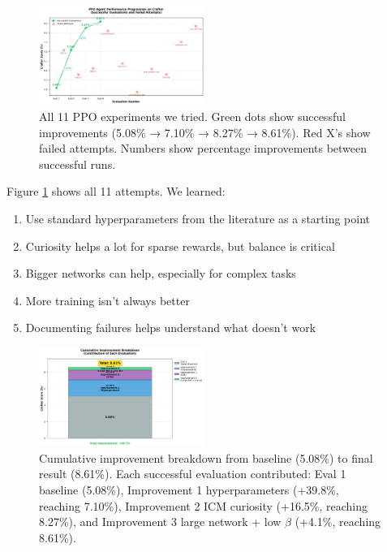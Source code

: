 \documentclass[conference]{IEEEtran}
\begin{document}
\begin{figure}[h!]
\centering
\includegraphics[width=0.48\textwidth]{fig1_score_progression.pdf}
\caption{All 11 PPO experiments we tried. Green dots show successful improvements (5.08\% → 7.10\% → 8.27\% → 8.61\%). Red X's show failed attempts. Numbers show percentage improvements between successful runs.}
\label{fig:all_attempts}
\end{figure}

Figure \ref{fig:all_attempts} shows all 11 attempts. We learned:

\begin{enumerate}
    \item Use standard hyperparameters from the literature as a starting point
    \item Curiosity helps a lot for sparse rewards, but balance is critical
    \item Bigger networks can help, especially for complex tasks
    \item More training isn't always better
    \item Documenting failures helps understand what doesn't work
\end{enumerate}

\begin{figure}[h!]
\centering
\includegraphics[width=0.48\textwidth]{fig5_improvement_breakdown.pdf}
\caption{Cumulative improvement breakdown from baseline (5.08\%) to final result (8.61\%). Each successful evaluation contributed: Eval 1 baseline (5.08\%), Improvement 1 hyperparameters (+39.8\%, reaching 7.10\%), Improvement 2 ICM curiosity (+16.5\%, reaching 8.27\%), and Improvement 3 large network + low $\beta$ (+4.1\%, reaching 8.61\%).}
\label{fig:breakdown}
\end{figure}
\end{document}
